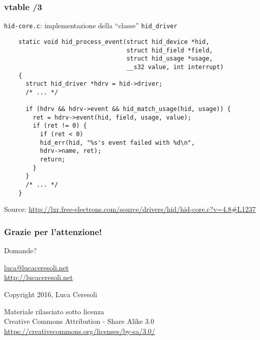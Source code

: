 \documentclass[xetex,table]{beamer}
\begin{document}
\begin{frame}[fragile]
  \frametitle{vtable /3}
  \texttt{hid-core.c}: implementazione della ``classe''
  \texttt{hid\_driver}

  \begin{verbatim}
    static void hid_process_event(struct hid_device *hid,
                                  struct hid_field *field,
                                  struct hid_usage *usage,
                                  __s32 value, int interrupt)
    {
      struct hid_driver *hdrv = hid->driver;
      /* ... */

      if (hdrv && hdrv->event && hid_match_usage(hid, usage)) {
        ret = hdrv->event(hid, field, usage, value);
        if (ret != 0) {
          if (ret < 0)
          hid_err(hid, "%s's event failed with %d\n",
          hdrv->name, ret);
          return;
        }
      }
      /* ... */
    }
  \end{verbatim}
  {\tiny Source:
    \url{http://lxr.free-electrons.com/source/drivers/hid/hid-core.c?v=4.8#L1237}}
\end{frame}

\begin{frame}
  \frametitle{Grazie per l'attenzione!}

  \begin{center}
    {\Huge Domande?}

    \vspace{0.1\textheight}

    \href{mailto:luca@lucaceresoli.net}{luca@lucaceresoli.net}\\
    \url{http://lucaceresoli.net}

    \textcopyright{} Copyright 2016, Luca Ceresoli\\

    \vspace{0.2\textheight}

    \tiny
    Materiale rilasciato sotto licenza\\
    Creative Commons Attribution - Share Alike 3.0 \\
    \url{https://creativecommons.org/licenses/by-sa/3.0/} \\
\end{center}
\end{frame}
\end{document}

